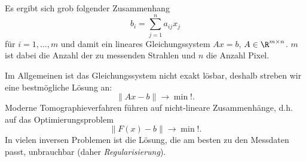 Es ergibt sich grob folgender Zusammenhang
\[
	b_i = \sum_{j=1}^n a_{ij} x_j
\]
für $i = 1, \dotsc, m$ und damit ein lineares Gleichungssystem $Ax = b$, $A \in \R^{m\times n}$.
$m$ ist dabei die Anzahl der zu messenden Strahlen und $n$ die Anzahl Pixel.

Im Allgemeinen ist das Gleichungssystem nicht exakt lösbar, deshalb streben wir eine bestmögliche Lösung an:
\[
	\|Ax - b\| \to \min!.
\]
Moderne Tomographieverfahren führen auf nicht-lineare Zusammenhänge, d.h. auf das Optimierungsproblem
\[
	\|F(x) - b\| \to \min!.
\]
In vielen inversen Problemen ist die Lösung, die am besten zu den Messdaten passt, unbrauchbar (daher \emph{Regularisierung}).
